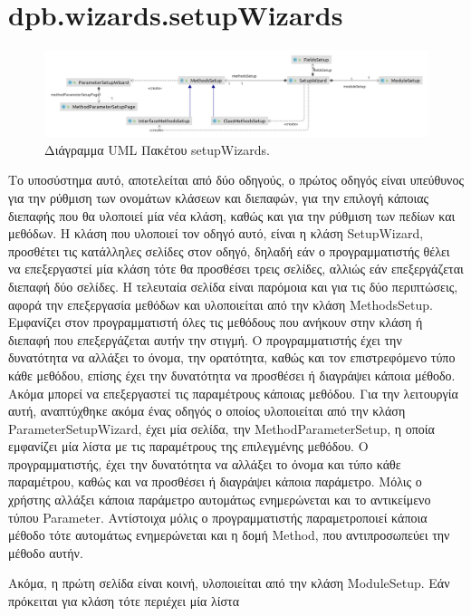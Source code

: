 \section{dpb.wizards.setupWizards}
\label{sec:dpb.wizards.setupWizards}
\begin{figure}[H]
    \centering
    \includegraphics[width=1.0\textwidth]{Figures/setupWizard.png}
    \caption{Διάγραμμα UML Πακέτου setupWizards.}
    \label{fig:setupWizardUML}
\end{figure}
\par
Το υποσύστημα αυτό, αποτελείται από δύο οδηγούς, ο πρώτος οδηγός είναι υπεύθυνος για την ρύθμιση των ονομάτων κλάσεων και διεπαφών, 
για την επιλογή κάποιας διεπαφής που θα υλοποιεί μία νέα κλάση, καθώς και για την ρύθμιση των πεδίων και μεθόδων. 
Η κλάση που υλοποιεί τον οδηγό αυτό, είναι η κλάση SetupWizard, προσθέτει τις κατάλληλες σελίδες στον οδηγό, δηλαδή εάν ο προγραμματιστής 
θέλει να επεξεργαστεί μία κλάση τότε θα προσθέσει τρεις σελίδες, αλλιώς εάν επεξεργάζεται διεπαφή δύο σελίδες. 
Η τελευταία σελίδα είναι παρόμοια και για τις δύο περιπτώσεις, αφορά την επεξεργασία μεθόδων και υλοποιείται από την κλάση MethodsSetup. 
Εμφανίζει στον προγραμματιστή όλες τις μεθόδους που ανήκουν στην κλάση ή διεπαφή που επεξεργάζεται αυτήν την στιγμή. 
Ο προγραμματιστής έχει την δυνατότητα να αλλάξει το όνομα, την ορατότητα, καθώς και τον επιστρεφόμενο τύπο κάθε μεθόδου, 
επίσης έχει την δυνατότητα να προσθέσει ή διαγράψει κάποια μέθοδο. Ακόμα μπορεί να επεξεργαστεί τις παραμέτρους κάποιας μεθόδου. 
Για την λειτουργία αυτή, αναπτύχθηκε ακόμα ένας οδηγός ο οποίος υλοποιείται από την κλάση ParameterSetupWizard, 
έχει μία σελίδα, την MethodParameterSetup, η οποία εμφανίζει μία λίστα με τις παραμέτρους της επιλεγμένης μεθόδου. Ο προγραμματιστής, 
έχει την δυνατότητα να αλλάξει το όνομα και τύπο κάθε παραμέτρου, καθώς και να προσθέσει ή διαγράψει κάποια παράμετρο. 
Μόλις ο χρήστης αλλάξει κάποια παράμετρο αυτομάτως ενημερώνεται και το αντικείμενο τύπου Parameter. 
Αντίστοιχα μόλις ο προγραμματιστής παραμετροποιεί κάποια μέθοδο τότε αυτομάτως ενημερώνεται και η δομή Method, 
που αντιπροσωπεύει την μέθοδο αυτήν.
\par Ακόμα, η πρώτη σελίδα είναι κοινή, υλοποιείται από την κλάση ModuleSetup. Εάν πρόκειται για κλάση τότε περιέχει μία λίστα 
